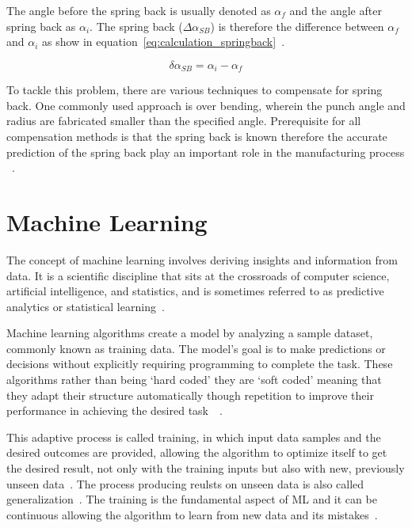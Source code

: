 The angle before the spring back is usually denoted as $\alpha_f$ and the angle after spring back as $\alpha_i$.
The spring back ($\Delta \alpha_{SB}$) is therefore the difference between $\alpha_f$ and
$\alpha_i$ as show in equation~\ref*{eq:calculation_springback}~\cite[p. 6]{cruz_applicationmachinelearning_2021}.

\begin{equation}
    \delta \alpha_{SB} = \alpha_i - \alpha_f
    \label{eq:calculation_springback}
\end{equation}

To tackle this problem, there are various techniques to compensate for spring back.
One commonly used approach is over bending, wherein the punch angle and radius are fabricated smaller than the
specified angle.
Prerequisite for all compensation methods is that the spring back is known therefore
the accurate prediction of the spring back play an important role in the manufacturing
process ~\cite[p. 114]{groover_fundamentalsmodernmanufacturing_2020}.


\section{Machine Learning}\label{sec:machine-learning}
The concept of machine learning involves deriving insights and information from data.
It is a scientific discipline that sits at the crossroads of computer science, artificial intelligence, and statistics,
and is sometimes referred to as predictive analytics or statistical
learning~\cite[p. 1]{muller_introductionmachinelearning_2016}.

Machine learning algorithms create a model by analyzing a sample dataset, commonly known as training data.
The model's goal is to make predictions or decisions without explicitly requiring programming to complete the task.
These algorithms rather than being `hard coded' they are `soft coded' meaning that they adapt their structure
automatically though repetition to improve their performance in achieving the desired
task~\cite[pp. 4]{el2015machine}~\cite[pp. 151--170]{koza1996automated}.

This adaptive process is called training, in which input data samples and the desired outcomes are provided, allowing
the algorithm to optimize itself to get the desired result, not only with the training inputs but also with
new, previously unseen data~\cite[pp. 4]{el2015machine}.
The process producing reulsts on unseen data is also called generalization~\cite[p. 4]{zhou_machinelearning_2021}.
The training is the fundamental aspect of \ac{ML} and it can be continuous allowing the algorithm to
learn from new data and its mistakes~\cite[pp. 4]{el2015machine}.

